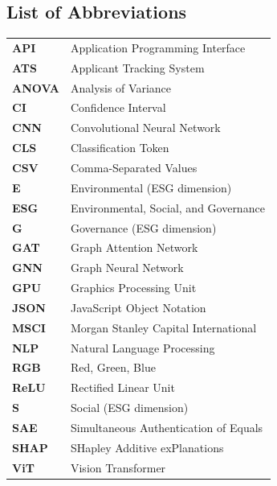 \begin{flushright}
\section*{List of Abbreviations}
\end{flushright}

\begin{tabular}{ll}
\textbf{API} & Application Programming Interface \\
\textbf{ATS} & Applicant Tracking System \\
\textbf{ANOVA} & Analysis of Variance \\
\textbf{CI} & Confidence Interval \\
\textbf{CNN} & Convolutional Neural Network \\
\textbf{CLS} & Classification Token \\
\textbf{CSV} & Comma-Separated Values \\
\textbf{E} & Environmental (ESG dimension) \\
\textbf{ESG} & Environmental, Social, and Governance \\
\textbf{G} & Governance (ESG dimension) \\
\textbf{GAT} & Graph Attention Network \\
\textbf{GNN} & Graph Neural Network \\
\textbf{GPU} & Graphics Processing Unit \\
\textbf{JSON} & JavaScript Object Notation \\
\textbf{MSCI} & Morgan Stanley Capital International \\
\textbf{NLP} & Natural Language Processing \\
\textbf{RGB} & Red, Green, Blue \\
\textbf{ReLU} & Rectified Linear Unit \\
\textbf{S} & Social (ESG dimension) \\
\textbf{SAE} & Simultaneous Authentication of Equals \\
\textbf{SHAP} & SHapley Additive exPlanations \\
\textbf{ViT} & Vision Transformer \\
\end{tabular}

\clearpage
